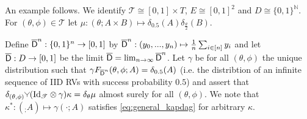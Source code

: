 An example follows. We identify $\mathscr{T}\cong[0,1]\times T$, $E\cong [0,1]^2$ and $D\cong\{0,1\}^{\mathbb{N}}$. For $(\theta,\phi)\in \mathscr{T}$ let $\mu:(\theta;A\times B)\mapsto \delta_{0.5}(A)\delta_{\frac{\theta}{2}}(B)$.

Define $\overline{\mathsf{D}}^n:\{0,1\}^n\to [0,1]$ by $\overline{\mathsf{D}}^n:(y_0,...,y_n)\mapsto \frac{1}{n} \sum_{i\in [n]} y_i$ and let $\overline{\mathsf{D}}:D\to [0,1]$ be the limit $\overline{\mathsf{D}}=\lim_{n\to\infty} \overline{\mathsf{D}}^n$. Let $\gamma$ be for all $(\theta,\phi)$ the unique distribution such that $\gamma F_{\overline{\mathsf{D}}^n} (\theta,\phi;A) = \delta_{0.5}(A)$ (i.e. the distribtion of an infinite sequence of IID RVs with success probability $0.5$) and assert that  $\delta_{(\theta,\phi)} \splitter{0.1}(\text{Id}_{\mathscr{T}}\otimes \gamma)\kappa = \delta_\theta \mu$ almost surely for all $(\theta,\phi)$. 
 We note that $\kappa^*:(_;A)\mapsto \gamma(\cdot;A)$ satisfies \ref{eq:general_kapdag} for arbitrary $\kappa$.



